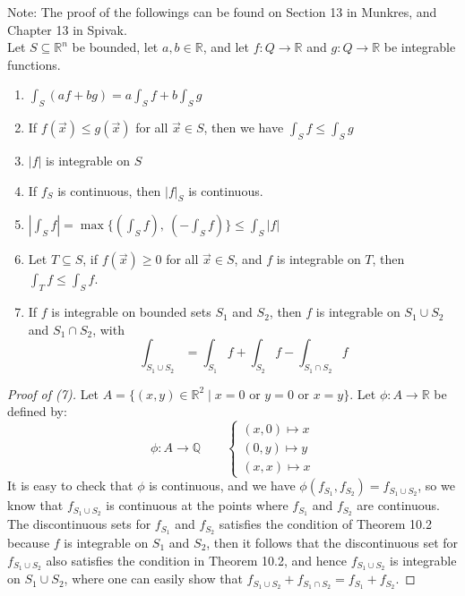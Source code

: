 \documentclass[11pt,oneside]{book}
\theoremstyle{break}
\theoremstyle{break}
\newcommand{\R}{\mathbb{R}}
\newcommand{\Q}{\mathbb{Q}}
\newcommand{\note}{\color{red}Note: \color{black}}
\begin{document}
\note The proof of the followings can be found on Section 13 in Munkres, and Chapter 13 in Spivak. \\
Let $S\subseteq \R^n$ be bounded, let $a,b \in \R$, and let $f:Q \to \R$ and $g:Q \to \R$ be integrable functions.
\begin{enumerate}[topsep=3pt,itemsep=-1ex,partopsep=1ex,parsep=1ex]
\item $\int_S(af+bg) = a\int_S f + b\int_S g$
\item If $f(\vec{x})\leq g(\vec{x})$ for all $\vec{x}\in S$, then we have $\int_S f \leq \int_S g$
\item $|f|$ is integrable on $S$
\item If $f_S$ is continuous, then $|f|_S$ is continuous. 
\item $|\int_S f| = \max\{ (\int_S f),\ (- \int_S f)\} \leq \int_S |f|$
\item Let $T \subseteq S$, if $f(\vec{x}) \geq 0$ for all $\vec{x}\in S$,  and $f$ is integrable on $T$, then $\int_T f \leq \int_S f$. 
\item If $f$ is integrable on bounded sets $S_1$ and $S_2$, then $f$ is integrable on $S_1 \cup S_2$ and $S_1 \cap S_2$, with $$\int_{S_1\cup S_2} = \int_{S_1} f + \int_{S_2} f - \int_{S_1\cap S_2} f$$
\end{enumerate}
\begin{proof}[Proof of (7)]
Let $A = \{ (x,y) \in \R^2 \mid x=0 \text{ or }y=0 \text{ or }x=y\}$. Let $\phi:A \to \R$ be defined by:
$$\phi:A \to \Q \qquad \begin{cases}(x,0) \mapsto x \\ (0,y) \mapsto y \\ (x,x) \mapsto x    \end{cases}$$
It is easy to check that $\phi$ is continuous, and we have $\phi(f_{S_1}, f_{S_2}) = f_{S_1\cup S_2}$, so we know that $f_{S_1\cup S_2} $ is continuous at the points where $f_{S_1}$ and $f_{S_2}$ are continuous. The discontinuous sets for $f_{S_1}$ and $f_{S_2}$ satisfies the condition of Theorem 10.2 because $f$ is integrable on $S_1$ and $S_2$, then it follows that the discontinuous set for $f_{S_1\cup S_2}$ also satisfies the condition in Theorem 10.2, and hence $f_{S_1\cup S_2}$ is integrable on $S_1 \cup S_2$, where one can easily show that $f_{S_1\cup S_2}+ f_{S_1\cap S_2} = f_{S_1} + f_{S_2}$. 
\end{proof}
\end{document}
